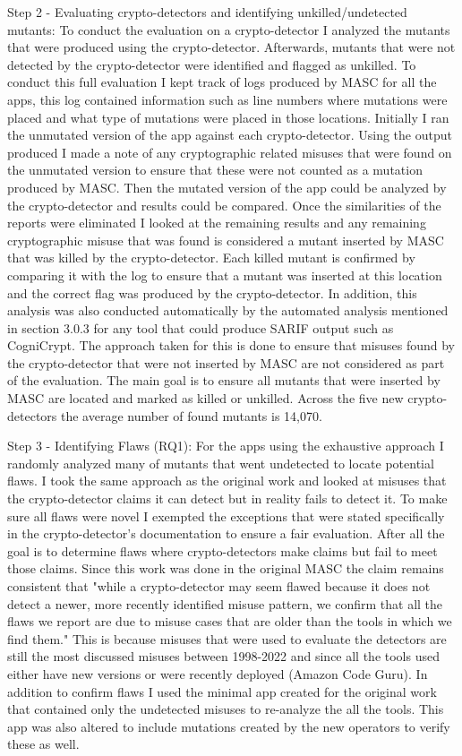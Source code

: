 Step 2 - Evaluating crypto-detectors and identifying unkilled/undetected mutants: To conduct the evaluation on a crypto-detector I analyzed the mutants that were produced using the crypto-detector. Afterwards, mutants that were not detected by the crypto-detector were identified and flagged as unkilled. To conduct this full evaluation I kept track of logs produced by MASC for all the apps, this log contained information such as line numbers where mutations were placed and what type of mutations were placed in those locations. Initially I ran the unmutated version of the app against each crypto-detector. Using the output produced I made a note of any cryptographic related misuses that were found on the unmutated version to ensure that these were not counted as a mutation produced by MASC. Then the mutated version of the app could be analyzed by the crypto-detector and results could be compared. Once the similarities of the reports were eliminated I looked at the remaining results and any remaining cryptographic misuse that was found is considered a mutant inserted by MASC that was killed by the crypto-detector. Each killed mutant is confirmed by comparing it with the log to ensure that a mutant was inserted at this location and the correct flag was produced by the crypto-detector. In addition, this analysis was also conducted automatically by the automated analysis mentioned in section 3.0.3 for any tool that could produce SARIF output such as CogniCrypt. The approach taken for this is done to ensure that misuses found by the crypto-detector that were not inserted by MASC are not considered as part of the evaluation. The main goal is to ensure all mutants that were inserted by MASC are located and marked as killed or unkilled. Across the five new crypto-detectors the average number of found mutants is 14,070.

Step 3 - Identifying Flaws (RQ1): For the apps using the exhaustive approach I randomly analyzed many of mutants that went undetected to locate potential flaws. I took the same approach as the original work and looked at misuses that the crypto-detector claims it can detect but in reality fails to detect it. To make sure all flaws were novel I exempted the exceptions that were stated specifically in the crypto-detector's documentation to ensure a fair evaluation. After all the goal is to determine flaws where crypto-detectors make claims but fail to meet those claims. Since this work was done in the original MASC the claim remains consistent that "while a crypto-detector may seem flawed because it does not detect a newer, more recently identified misuse pattern, we confirm that all the flaws we report are due to misuse cases that are older than the tools in which we find them." This is because misuses that were used to evaluate the detectors are still the most discussed misuses between 1998-2022 and since all the tools used either have new versions or were recently deployed (Amazon Code Guru). In addition to confirm flaws I used the minimal app created for the original work that contained only the undetected misuses to re-analyze the all the tools. This app was also altered to include mutations created by the new operators to verify these as well.

